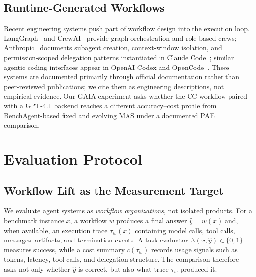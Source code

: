 \subsection{Runtime-Generated Workflows}
Recent engineering systems push part of workflow design into the execution loop.
LangGraph~\citep{langgraph_docs} and CrewAI~\citep{crewai_docs} provide graph orchestration and role-based crews; Anthropic~\citep{anthropic_building_effective_agents,anthropic_multiagent_research_system,anthropic_context_engineering} documents subagent creation, context-window isolation, and permission-scoped delegation patterns instantiated in Claude Code~\citep{anthropic_claude_code_product,anthropic_claude_code_overview,anthropic_claude_code_subagents}; similar agentic coding interfaces appear in OpenAI Codex and OpenCode~\citep{openai_codex_product,opencode_product}.
These systems are documented primarily through official documentation rather than peer-reviewed publications; we cite them as engineering descriptions, not empirical evidence.
Our GAIA experiment asks whether the CC-workflow paired with a GPT-4.1 backend reaches a different accuracy--cost profile from BenchAgent-based fixed and evolving MAS under a documented PAE comparison.


\section{Evaluation Protocol}
\label{sec:evaluation_protocol}
\subsection{Workflow Lift as the Measurement Target}
We evaluate agent systems as \emph{workflow organizations}, not isolated products.
For a benchmark instance \(x\), a workflow \(w\) produces a final answer \(\hat{y}=w(x)\) and, when available, an execution trace \(\tau_w(x)\) containing model calls, tool calls, messages, artifacts, and termination events.
A task evaluator \(E(x,\hat{y}) \in \{0,1\}\) measures success, while a cost summary \(c(\tau_w)\) records usage signals such as tokens, latency, tool calls, and delegation structure.
The comparison therefore asks not only whether \(\hat{y}\) is correct, but also what trace \(\tau_w\) produced it.


